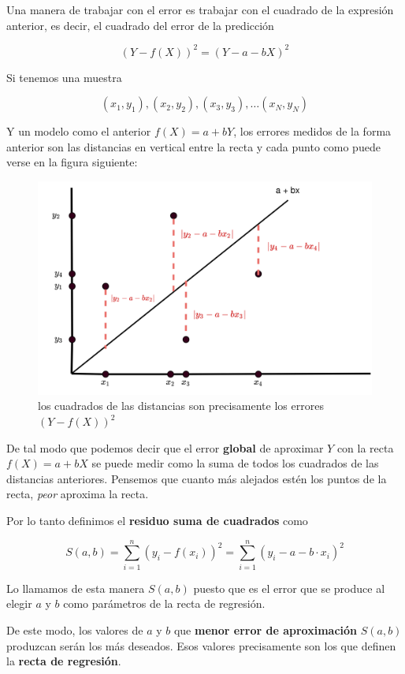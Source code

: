 \documentclass[]{book}
\theoremstyle{plain}
\theoremstyle{definition}
\begin{document}
Una manera de trabajar con el error es trabajar con el cuadrado de la
expresión anterior, es decir, el cuadrado del error de la predicción

\[(Y- f(X))^2 = (Y- a - bX)^2\]

Si tenemos una muestra

\[(x_1, y_1), (x_2, y_2), (x_3,y_3), \ldots (x_N,y_N)\]

Y un modelo como el anterior \(f(X) = a + bY\), los errores medidos de
la forma anterior son las distancias en vertical entre la recta y cada
punto como puede verse en la figura siguiente:

\begin{figure}
\centering
\includegraphics[width=4.6875in,height=\textheight]{img/least_squares.png}
\caption{los cuadrados de las distancias son precisamente los errores
\((Y- f(X))^2\)}
\end{figure}

De tal modo que podemos decir que el error \textbf{global} de aproximar
\(Y\) con la recta \(f(X)= a+bX\) se puede medir como la suma de todos
los cuadrados de las distancias anteriores. Pensemos que cuanto más
alejados estén los puntos de la recta, \emph{peor} aproxima la recta.

Por lo tanto definimos el \textbf{residuo suma de cuadrados} como

\[S(a,b) =  \sum^n_{i=1} (y_i - f(x_i))^2 =  \sum^n_{i=1} (y_i - a -b\cdot x_i)^2\]

Lo llamamos de esta manera \(S(a,b)\) puesto que es el error que se
produce al elegir \(a\) y \(b\) como parámetros de la recta de
regresión.

De este modo, los valores de \(a\) y \(b\) que \textbf{menor error de
aproximación} \(S(a,b)\) produzcan serán los más deseados. Esos valores
precisamente son los que definen la \textbf{recta de regresión}.
\end{document}
